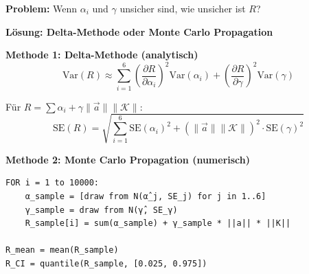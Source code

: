 \begin{tcolorbox}[colback=gray!5!white, colframe=gray!75!black,
    title=\textbf{Theorem HHH-T13: Score-Unsicherheit aus LLMMC}]

\textbf{Problem:} Wenn $\alpha_i$ und $\gamma$ unsicher sind, wie unsicher ist $R$?

\textbf{Lösung: Delta-Methode oder Monte Carlo Propagation}

\textbf{Methode 1: Delta-Methode (analytisch)}
\begin{equation}
\text{Var}(R) \approx \sum_{i=1}^{6} \left(\frac{\partial R}{\partial \alpha_i}\right)^2 \text{Var}(\alpha_i) + \left(\frac{\partial R}{\partial \gamma}\right)^2 \text{Var}(\gamma)
\end{equation}

Für $R = \sum \alpha_i + \gamma \|\vec{a}\| \|\mathcal{K}\|$:
\begin{equation}
\text{SE}(R) = \sqrt{\sum_{i=1}^{6} \text{SE}(\alpha_i)^2 + (\|\vec{a}\| \|\mathcal{K}\|)^2 \cdot \text{SE}(\gamma)^2}
\end{equation}

\textbf{Methode 2: Monte Carlo Propagation (numerisch)}
\begin{verbatim}
FOR i = 1 to 10000:
    α_sample = [draw from N(α̂_j, SE_j) for j in 1..6]
    γ_sample = draw from N(γ̂, SE_γ)
    R_sample[i] = sum(α_sample) + γ_sample * ||a|| * ||K||

R_mean = mean(R_sample)
R_CI = quantile(R_sample, [0.025, 0.975])
\end{verbatim}

\end{tcolorbox}

